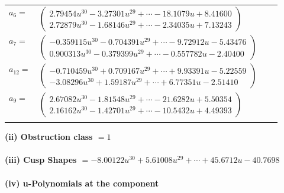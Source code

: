 \documentclass[1p]{elsarticle_modified}
\theoremstyle{definition}
\begin{document}
\begin{tabular}{m{7pt} m{180pt} m{7pt} m{180pt} }
\flushright $a_{6}=$&$\begin{pmatrix}2.79454 u^{30}-3.27301 u^{29}+\cdots-18.1079 u+8.41600\\2.72879 u^{30}-1.68146 u^{29}+\cdots-2.34035 u+7.13243\end{pmatrix}$ \\
\flushright $a_{7}=$&$\begin{pmatrix}-0.359115 u^{30}-0.704391 u^{29}+\cdots-9.72912 u-5.43476\\0.900313 u^{30}-0.379399 u^{29}+\cdots-0.557782 u-2.40400\end{pmatrix}$ \\
\flushright $a_{12}=$&$\begin{pmatrix}-0.710459 u^{30}+0.709167 u^{29}+\cdots+9.93391 u-5.22559\\-3.08296 u^{30}+1.59187 u^{29}+\cdots+6.77351 u-2.51410\end{pmatrix}$ \\
\flushright $a_{9}=$&$\begin{pmatrix}2.67082 u^{30}-1.81548 u^{29}+\cdots-21.6282 u+5.50354\\2.16162 u^{30}-1.42701 u^{29}+\cdots-10.5432 u+4.49393\end{pmatrix}$\\&\end{tabular}
\flushleft \textbf{(ii) Obstruction class $= 1$}\\~\\
\flushleft \textbf{(iii) Cusp Shapes $= -8.00122 u^{30}+5.61008 u^{29}+\cdots+45.6712 u-40.7698$}\\~\\
\newpage\renewcommand{\arraystretch}{1}
\flushleft \textbf{(iv) u-Polynomials at the component}\newline \\
\end{document}
